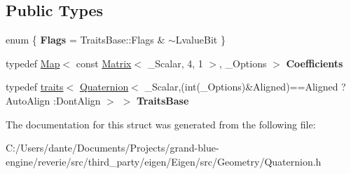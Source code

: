 \subsection*{Public Types}
\begin{DoxyCompactItemize}
\item 
\mbox{\label{struct_eigen_1_1internal_1_1traits_3_01_map_3_01const_01_quaternion_3_01___scalar_01_4_00_01___options_01_4_01_4_a79d0299eb52b1f0c8003164cf3467b21}} 
enum \{ {\bfseries Flags} = Traits\+Base\+::Flags \& $\sim$\+Lvalue\+Bit
 \}
\item 
\mbox{\label{struct_eigen_1_1internal_1_1traits_3_01_map_3_01const_01_quaternion_3_01___scalar_01_4_00_01___options_01_4_01_4_a7f06dc786624ddaab7233c12eaf696d1}} 
typedef \mbox{\hyperlink{class_eigen_1_1_map}{Map}}$<$ const \mbox{\hyperlink{class_eigen_1_1_matrix}{Matrix}}$<$ \+\_\+\+Scalar, 4, 1 $>$, \+\_\+\+Options $>$ {\bfseries Coefficients}
\item 
\mbox{\label{struct_eigen_1_1internal_1_1traits_3_01_map_3_01const_01_quaternion_3_01___scalar_01_4_00_01___options_01_4_01_4_aab4d999273f7f2590a7a6e40dd00ac6c}} 
typedef \mbox{\hyperlink{struct_eigen_1_1internal_1_1traits}{traits}}$<$ \mbox{\hyperlink{class_eigen_1_1_quaternion}{Quaternion}}$<$ \+\_\+\+Scalar,(int(\+\_\+\+Options)\&Aligned)==Aligned ? Auto\+Align \+:Dont\+Align $>$ $>$ {\bfseries Traits\+Base}
\end{DoxyCompactItemize}


The documentation for this struct was generated from the following file\+:\begin{DoxyCompactItemize}
\item 
C\+:/\+Users/dante/\+Documents/\+Projects/grand-\/blue-\/engine/reverie/src/third\+\_\+party/eigen/\+Eigen/src/\+Geometry/Quaternion.\+h\end{DoxyCompactItemize}
